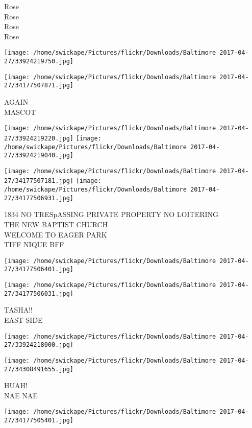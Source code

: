 \documentclass[10pt,letterpaper]{article}
\begin{document}
Rose\\
Rose\\
Rose\\
Rose
\pagebreak

\texttt{[image: /home/swickape/Pictures/flickr/Downloads/Baltimore 2017-04-27/33924219750.jpg]}

\vspace{0.25in}
\texttt{[image: /home/swickape/Pictures/flickr/Downloads/Baltimore 2017-04-27/34177507871.jpg]}

AGAIN\\
MASCOT
\pagebreak

\texttt{[image: /home/swickape/Pictures/flickr/Downloads/Baltimore 2017-04-27/33924219220.jpg]}
\texttt{[image: /home/swickape/Pictures/flickr/Downloads/Baltimore 2017-04-27/33924219040.jpg]}

\texttt{[image: /home/swickape/Pictures/flickr/Downloads/Baltimore 2017-04-27/34177507181.jpg]}
\texttt{[image: /home/swickape/Pictures/flickr/Downloads/Baltimore 2017-04-27/34177506931.jpg]}

1834 NO TRESpASSING PRIVATE PROPERTY NO LOITERING\\
THE NEW BAPTIST CHURCH\\
WELCOME TO EAGER PARK\\
TIFF NIQUE BFF
\pagebreak

\texttt{[image: /home/swickape/Pictures/flickr/Downloads/Baltimore 2017-04-27/34177506401.jpg]}

\vspace{0.25in}
\texttt{[image: /home/swickape/Pictures/flickr/Downloads/Baltimore 2017-04-27/34177506031.jpg]}

TASHA!!\\
EAST SIDE
\pagebreak

\texttt{[image: /home/swickape/Pictures/flickr/Downloads/Baltimore 2017-04-27/33924218000.jpg]}

\vspace{0.25in}
\texttt{[image: /home/swickape/Pictures/flickr/Downloads/Baltimore 2017-04-27/34308491655.jpg]}

HUAH!\\
NAE NAE
\pagebreak

\texttt{[image: /home/swickape/Pictures/flickr/Downloads/Baltimore 2017-04-27/34177505401.jpg]}
\end{document}
